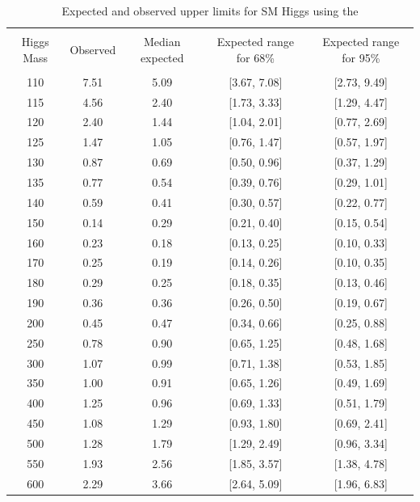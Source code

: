\begin{table}[hbp!]
\begin{center}
\begin{tabular}{c c c c c}
\hline
\vspace{-3mm} && \\
 Higgs Mass & Observed  & Median expected & Expected range for 68\% & Expected range for 95\%   \\
\hline
\vspace{-3mm} && \\
110 & 7.51 & 5.09 & [3.67, 7.08] & [2.73, 9.49] \\
115 & 4.56 & 2.40 & [1.73, 3.33] & [1.29, 4.47] \\
120 & 2.40 & 1.44 & [1.04, 2.01] & [0.77, 2.69] \\
125 & 1.47 & 1.05 & [0.76, 1.47] & [0.57, 1.97] \\
130 & 0.87 & 0.69 & [0.50, 0.96] & [0.37, 1.29] \\
135 & 0.77 & 0.54 & [0.39, 0.76] & [0.29, 1.01] \\
140 & 0.59 & 0.41 & [0.30, 0.57] & [0.22, 0.77] \\
150 & 0.14 & 0.29 & [0.21, 0.40] & [0.15, 0.54] \\
160 & 0.23 & 0.18 & [0.13, 0.25] & [0.10, 0.33] \\
170 & 0.25 & 0.19 & [0.14, 0.26] & [0.10, 0.35] \\
180 & 0.29 & 0.25 & [0.18, 0.35] & [0.13, 0.46] \\
190 & 0.36 & 0.36 & [0.26, 0.50] & [0.19, 0.67] \\
200 & 0.45 & 0.47 & [0.34, 0.66] & [0.25, 0.88] \\
250 & 0.78 & 0.90 & [0.65, 1.25] & [0.48, 1.68] \\
300 & 1.07 & 0.99 & [0.71, 1.38] & [0.53, 1.85] \\
350 & 1.00 & 0.91 & [0.65, 1.26] & [0.49, 1.69] \\
400 & 1.25 & 0.96 & [0.69, 1.33] & [0.51, 1.79] \\
450 & 1.08 & 1.29 & [0.93, 1.80] & [0.69, 2.41] \\
500 & 1.28 & 1.79 & [1.29, 2.49] & [0.96, 3.34] \\
550 & 1.93 & 2.56 & [1.85, 3.57] & [1.38, 4.78] \\
600 & 2.29 & 3.66 & [2.64, 5.09] & [1.96, 6.83] \\
\hline
\end{tabular}
\caption{Expected and observed upper limits for SM Higgs using the
}
\end{center}
\end{table}
